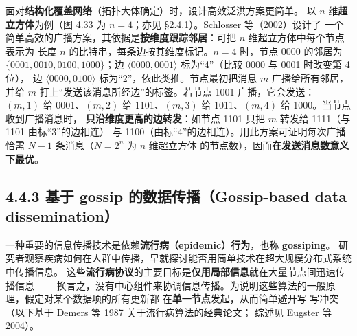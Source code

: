 \medskip\noindent 面对\textbf{结构化覆盖网络}（拓扑大体确定）时，设计高效泛洪方案更简单。
以 $n$ 维\textbf{超立方体}为例（图 4.33 为 $n=4$；亦见 §2.4.1）。Schlosser 等（2002）设计了
一个简单高效的广播方案，其依据是\textbf{按维度跟踪邻居}：可把 $n$ 维超立方体中每个节点表示为
长度 $n$ 的比特串，每条边按其维度标记。$n=4$ 时，节点 0000 的邻居为
$\{0001,0010,0100,1000\}$；边 $\langle 0000,0001\rangle$ 标为“4”（比较 0000 与 0001 时改变第 4 位），
边 $\langle 0000,0100\rangle$ 标为“2”，依此类推。节点最初把消息 $m$ 广播给所有邻居，
并给 $m$ 打上“发送该消息所经边”的标签。若节点 1001 广播，它会发送：
$(m,1)$ 给 0001、$(m,2)$ 给 1101、$(m,3)$ 给 1011、$(m,4)$ 给 1000。当节点收到广播消息时，
\textbf{只沿维度更高的边转发}：如节点 1101 只把 $m$ 转发给 1111（与 1101 由标“3”的边相连）
与 1100（由标“4”的边相连）。用此方案可证明每次广播恰需 $N-1$ 条消息（$N=2^n$ 为 $n$ 维超立方体
的节点数），因而\textbf{在发送消息数意义下最优}。

\begin{closeread}
\end{closeread}


\subsection*{4.4.3 基于 gossip 的数据传播（Gossip-based data dissemination）}
一种重要的信息传播技术是依赖\textbf{流行病（epidemic）行为}，也称 \textbf{gossiping}。
研究者观察疾病如何在人群中传播，早就探讨能否用简单技术在超大规模分布式系统中传播信息。
这些\textbf{流行病协议}的主要目标是\textbf{仅用局部信息}就在大量节点间迅速传播信息——
换言之，没有中心组件来协调信息传播。为说明这些算法的一般原理，假定对某个数据项的所有更新都
在\textbf{单一节点}发起，从而简单避开写-写冲突（以下基于 Demers 等 1987 关于流行病算法的经典论文；
综述见 Eugster 等 2004）。


